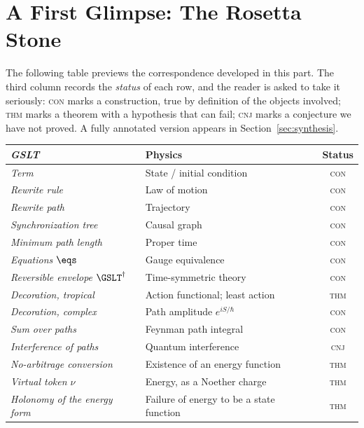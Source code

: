 \section{A First Glimpse: The Rosetta Stone}

The following table previews the correspondence developed in this part.
The third column records the \emph{status} of each row, and the reader is
asked to take it seriously: \textsc{con} marks a construction, true by
definition of the objects involved; \textsc{thm} marks a theorem with a
hypothesis that can fail; \textsc{cnj} marks a conjecture we have not
proved.  A fully annotated version appears in
Section~\ref{sec:synthesis}.

\begin{center}
\renewcommand{\arraystretch}{1.35}
\begin{tabular}{>{\itshape}p{4.3cm} p{5.9cm} c}
\toprule
\normalfont\textbf{GSLT} & \textbf{Physics} & \textbf{Status} \\
\midrule
Term                          & State / initial condition & \textsc{con} \\
Rewrite rule                  & Law of motion & \textsc{con} \\
Rewrite path                  & Trajectory & \textsc{con} \\
Synchronization tree          & Causal graph & \textsc{con} \\
Minimum path length           & Proper time & \textsc{con} \\
Equations $\eqs$              & Gauge equivalence & \textsc{con} \\
Reversible envelope $\GSLT^\dagger$ & Time-symmetric theory & \textsc{con} \\
Decoration, tropical          & Action functional; least action & \textsc{thm} \\
Decoration, complex           & Path amplitude $e^{iS/\hbar}$ & \textsc{con} \\
Sum over paths                & Feynman path integral & \textsc{con} \\
Interference of paths         & Quantum interference & \textsc{cnj} \\
No-arbitrage conversion       & Existence of an energy function & \textsc{thm} \\
Virtual token $\nu$           & Energy, as a Noether charge & \textsc{thm} \\
Holonomy of the energy form   & Failure of energy to be a state function & \textsc{thm} \\

\end{tabular}
\end{center}
